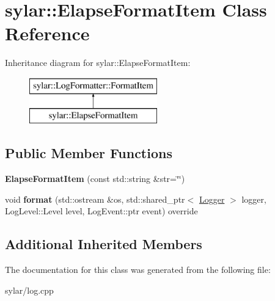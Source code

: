 \hypertarget{classsylar_1_1ElapseFormatItem}{\section{sylar\-:\-:Elapse\-Format\-Item Class Reference}
\label{classsylar_1_1ElapseFormatItem}
}
Inheritance diagram for sylar\-:\-:Elapse\-Format\-Item\-:\begin{figure}[H]
\begin{center}
\leavevmode
\includegraphics[height=2.000000cm]{classsylar_1_1ElapseFormatItem}
\end{center}
\end{figure}
\subsection*{Public Member Functions}
\begin{DoxyCompactItemize}
\item 
\hypertarget{classsylar_1_1ElapseFormatItem_a88829750e488d2f4ca5fb1edc5a07f1f}{{\bfseries Elapse\-Format\-Item} (const std\-::string \&str=\char`\"{}\char`\"{})}\label{classsylar_1_1ElapseFormatItem_a88829750e488d2f4ca5fb1edc5a07f1f}

\item 
\hypertarget{classsylar_1_1ElapseFormatItem_a6ed5a314bfea667948cbfdfbf4f1ab4e}{void {\bfseries format} (std\-::ostream \&os, std\-::shared\-\_\-ptr$<$ \hyperlink{classsylar_1_1Logger}{Logger} $>$ logger, Log\-Level\-::\-Level level, Log\-Event\-::ptr event) override}\label{classsylar_1_1ElapseFormatItem_a6ed5a314bfea667948cbfdfbf4f1ab4e}

\end{DoxyCompactItemize}
\subsection*{Additional Inherited Members}


The documentation for this class was generated from the following file\-:\begin{DoxyCompactItemize}
\item 
sylar/log.\-cpp\end{DoxyCompactItemize}
